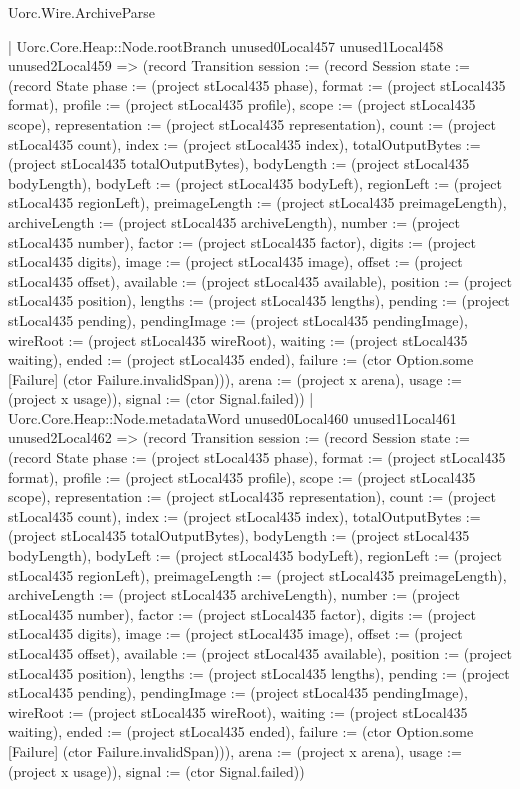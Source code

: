 \begin{lexlean}{Uorc.Wire.ArchiveParse}
\begin{semanticmodule}
{        | Uorc.Core.Heap::Node.rootBranch unused0Local457 unused1Local458 unused2Local459 => (record Transition {session := (record Session {state := (record State {phase := (project stLocal435 phase), format := (project stLocal435 format), profile := (project stLocal435 profile), scope := (project stLocal435 scope), representation := (project stLocal435 representation), count := (project stLocal435 count), index := (project stLocal435 index), totalOutputBytes := (project stLocal435 totalOutputBytes), bodyLength := (project stLocal435 bodyLength), bodyLeft := (project stLocal435 bodyLeft), regionLeft := (project stLocal435 regionLeft), preimageLength := (project stLocal435 preimageLength), archiveLength := (project stLocal435 archiveLength), number := (project stLocal435 number), factor := (project stLocal435 factor), digits := (project stLocal435 digits), image := (project stLocal435 image), offset := (project stLocal435 offset), available := (project stLocal435 available), position := (project stLocal435 position), lengths := (project stLocal435 lengths), pending := (project stLocal435 pending), pendingImage := (project stLocal435 pendingImage), wireRoot := (project stLocal435 wireRoot), waiting := (project stLocal435 waiting), ended := (project stLocal435 ended), failure := (ctor Option.some [Failure] (ctor Failure.invalidSpan))}), arena := (project x arena), usage := (project x usage)}), signal := (ctor Signal.failed)})
        | Uorc.Core.Heap::Node.metadataWord unused0Local460 unused1Local461 unused2Local462 => (record Transition {session := (record Session {state := (record State {phase := (project stLocal435 phase), format := (project stLocal435 format), profile := (project stLocal435 profile), scope := (project stLocal435 scope), representation := (project stLocal435 representation), count := (project stLocal435 count), index := (project stLocal435 index), totalOutputBytes := (project stLocal435 totalOutputBytes), bodyLength := (project stLocal435 bodyLength), bodyLeft := (project stLocal435 bodyLeft), regionLeft := (project stLocal435 regionLeft), preimageLength := (project stLocal435 preimageLength), archiveLength := (project stLocal435 archiveLength), number := (project stLocal435 number), factor := (project stLocal435 factor), digits := (project stLocal435 digits), image := (project stLocal435 image), offset := (project stLocal435 offset), available := (project stLocal435 available), position := (project stLocal435 position), lengths := (project stLocal435 lengths), pending := (project stLocal435 pending), pendingImage := (project stLocal435 pendingImage), wireRoot := (project stLocal435 wireRoot), waiting := (project stLocal435 waiting), ended := (project stLocal435 ended), failure := (ctor Option.some [Failure] (ctor Failure.invalidSpan))}), arena := (project x arena), usage := (project x usage)}), signal := (ctor Signal.failed)})
}
\end{semanticmodule}
\end{lexlean}

